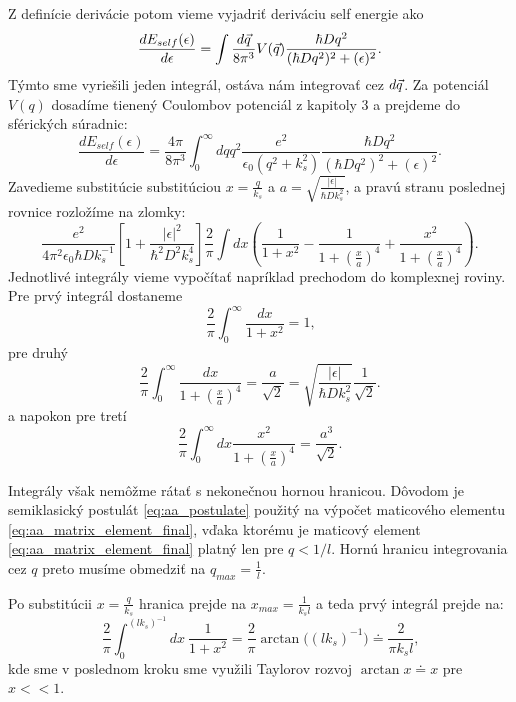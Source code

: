 Z definície derivácie potom vieme vyjadriť deriváciu self energie ako
\begin{equation}
 \label{eq:aa_selfenergy_der}
 \frac{dE_{self}(\epsilon)}{d\epsilon}=\int \frac{d\vec{q}}{8\pi^3}V(\vec{q})\frac{\hbar D q^2}{(\hbar Dq^2)^2+(\epsilon)^2}\text{.}
\end{equation}
Týmto sme vyriešili jeden integrál, ostáva nám integrovať cez $d\vec{q}$. Za potenciál $V(q)$ dosadíme tienený Coulombov potenciál
z kapitoly 3 a prejdeme do sférických súradnic:
\begin{equation}
 \frac{dE_{self}(\epsilon)}{d\epsilon}= \frac{4\pi}{8\pi^3} \int_0^\infty dq q^2 \frac{e^2}{\epsilon_0(q^2+k_s^2)}\frac{\hbar D q^2}{(\hbar Dq^2)^2+(\epsilon)^2} \text{.}
\end{equation}
Zavedieme substitúcie substitúciou $x=\frac{q}{k_s}$ a $a=\sqrt{\frac{|\epsilon|}{\hbar D k_s^2}}$, a pravú stranu poslednej rovnice rozložíme na zlomky:
\begin{equation}
\label{eq:aa_selfenergy_der_subst1}
\frac{e^2}{4\pi^2 \epsilon_0 \hbar D k_s^{-1}}[1+\frac{|\epsilon|^2}{\hbar^2D^2k_s^4}]\frac{2}{\pi}\int dx(\frac{1}{1+x^2}-
\frac{1}{1+(\frac{x}{a})^4}+\frac{x^2}{1+(\frac{x}{a})^4})\text{.}
\end{equation}
Jednotlivé integrály vieme vypočítať napríklad prechodom do komplexnej roviny.
Pre prvý integrál dostaneme
\begin{equation}
 \label{eq:aa_int1}
 \frac{2}{\pi}\int_0^{\infty}\frac{dx}{1+x^2}=1\text{,}
\end{equation}
pre druhý
\begin{equation}
 \label{eq:aa_int2}
 \frac{2}{\pi}\int_0^{\infty}\frac{dx}{1+(\frac{x}{a})^4}=\frac{a}{\sqrt{2}}=\sqrt{\frac{|\epsilon|}{\hbar D k_s^2}} \frac{1}{\sqrt{2}}\text{.}
\end{equation}
a napokon pre tretí
\begin{equation}
 \label{eq:aa_int3}
 \frac{2}{\pi}\int_0^{\infty}dx\frac{x^2}{1+(\frac{x}{a})^4}=\frac{a^3}{\sqrt{2}}\text{.}
\end{equation}

Integrály však nemôžme rátať s nekonečnou hornou hranicou. Dôvodom je semiklasický postulát \eqref{eq:aa_postulate}
použitý na výpočet maticového elementu \eqref{eq:aa_matrix_element_final}, vďaka ktorému je maticový element \eqref{eq:aa_matrix_element_final} platný len pre $q < 1/l$.
Hornú hranicu integrovania cez $q$ preto musíme obmedziť
na $q_{max}=\frac{1}{l}$.

Po substitúcii $x=\frac{q}{k_s}$ hranica prejde na  $x_{max}=\frac{1}{k_sl}$ a teda prvý integrál prejde na:
\begin{equation}
 \label{eq:aa_int1_capped}
 \frac{2}{\pi}\int_0^{(l k_s)^{-1}}dx \ \frac{1}{1+x^2}= \frac{2}{\pi}\arctan\bigl((lk_s)^{-1}\bigr)\doteq \frac{2}{\pi k_s l}\text{,}
\end{equation}
kde sme v poslednom kroku sme využili Taylorov rozvoj $\arctan{x}\doteq x$ pre  $x<<1$.


